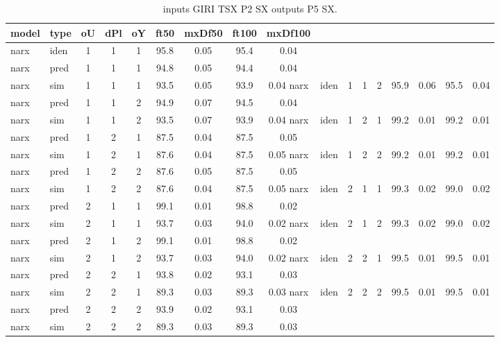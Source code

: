 \begin{center} 
\begin{longtable}{ll|ccc|cc|cc} 
\caption[inputs GIRI TSX P2 SX   outputs P5 SX]{inputs GIRI TSX P2 SX   outputs P5 SX.} 
\label{tab:inputs_GIRI_TSX_P2_SX___outputs_P5_SX} 
\hline 
  model & type & oU & dPl & oY & ft50 & mxDf50 & ft100 & mxDf100 \\ 
 \hline 
narx & iden & 1 & 1 & 1 & 95.8 & 0.05 & 95.4 & 0.04 \\ 
narx & pred & 1 & 1 & 1 & 94.8 & 0.05 & 94.4 & 0.04 \\ 
narx & sim  & 1 & 1 & 1 & 93.5 & 0.05 & 93.9 & 0.04 
 \hline 
narx & iden & 1 & 1 & 2 & 95.9 & 0.06 & 95.5 & 0.04 \\ 
narx & pred & 1 & 1 & 2 & 94.9 & 0.07 & 94.5 & 0.04 \\ 
narx & sim  & 1 & 1 & 2 & 93.5 & 0.07 & 93.9 & 0.04 
 \hline 
narx & iden & 1 & 2 & 1 & 99.2 & 0.01 & 99.2 & 0.01 \\ 
narx & pred & 1 & 2 & 1 & 87.5 & 0.04 & 87.5 & 0.05 \\ 
narx & sim  & 1 & 2 & 1 & 87.6 & 0.04 & 87.5 & 0.05 
 \hline 
narx & iden & 1 & 2 & 2 & 99.2 & 0.01 & 99.2 & 0.01 \\ 
narx & pred & 1 & 2 & 2 & 87.6 & 0.05 & 87.5 & 0.05 \\ 
narx & sim  & 1 & 2 & 2 & 87.6 & 0.04 & 87.5 & 0.05 
 \hline 
narx & iden & 2 & 1 & 1 & 99.3 & 0.02 & 99.0 & 0.02 \\ 
narx & pred & 2 & 1 & 1 & 99.1 & 0.01 & 98.8 & 0.02 \\ 
narx & sim  & 2 & 1 & 1 & 93.7 & 0.03 & 94.0 & 0.02 
 \hline 
narx & iden & 2 & 1 & 2 & 99.3 & 0.02 & 99.0 & 0.02 \\ 
narx & pred & 2 & 1 & 2 & 99.1 & 0.01 & 98.8 & 0.02 \\ 
narx & sim  & 2 & 1 & 2 & 93.7 & 0.03 & 94.0 & 0.02 
 \hline 
narx & iden & 2 & 2 & 1 & 99.5 & 0.01 & 99.5 & 0.01 \\ 
narx & pred & 2 & 2 & 1 & 93.8 & 0.02 & 93.1 & 0.03 \\ 
narx & sim  & 2 & 2 & 1 & 89.3 & 0.03 & 89.3 & 0.03 
 \hline 
narx & iden & 2 & 2 & 2 & 99.5 & 0.01 & 99.5 & 0.01 \\ 
narx & pred & 2 & 2 & 2 & 93.9 & 0.02 & 93.1 & 0.03 \\ 
narx & sim  & 2 & 2 & 2 & 89.3 & 0.03 & 89.3 & 0.03 
 \hline 
\end{longtable} 
\end{center}